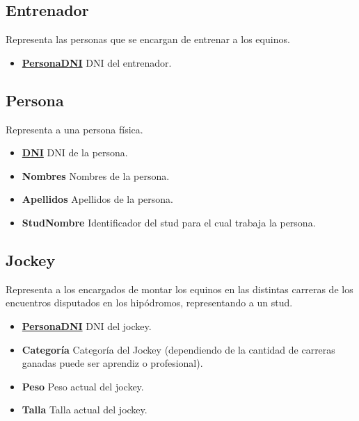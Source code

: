 \documentclass[a4paper,11pt]{article}
\begin{document}
\subsection{Entrenador}

Representa las personas que se encargan de entrenar a los equinos.

\begin{itemize}

	\item \textbf{\uline{PersonaDNI}} DNI del entrenador.
	
\end{itemize}

\subsection{Persona}

Representa a una persona física.

\begin{itemize}

	\item \textbf{\uline{DNI}} DNI de la persona.
	
	\item \textbf{Nombres} Nombres de la persona.
	
	\item \textbf{Apellidos} Apellidos de la persona.
	
	\item \textbf{StudNombre} Identificador del stud para el cual trabaja la persona.
	
\end{itemize}

\subsection{Jockey}

Representa a los encargados de montar los equinos en las distintas carreras 
de los encuentros disputados en los hipódromos, representando a un stud.

\begin{itemize}

	\item \textbf{\uline{PersonaDNI}} DNI del jockey.
	
	\item \textbf{Categoría} Categoría del Jockey (dependiendo de la cantidad
	de carreras ganadas puede ser aprendiz o profesional).
	
	\item \textbf{Peso} Peso actual del jockey.
	
	\item \textbf{Talla} Talla actual del jockey.

\end{itemize}
\end{document}

